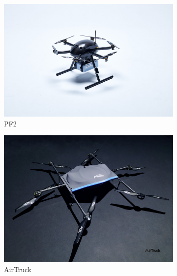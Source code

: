 \begin{figure}
    \centering
    \begin{subfigure}[b]{0.45\textwidth}
        \centering
        \includegraphics[width=\textwidth]{partes/img/PF2.jpg}
        \caption{PF2}
        \label{fig:pf2}
    \end{subfigure}
    \hfill
    \begin{subfigure}[b]{0.45\textwidth}
        \centering
        \includegraphics[width=\textwidth]{partes/img/AirTruck.jpg}
        \caption{AirTruck}
        \label{fig:AirTruck}
    \end{subfigure}
    \break
    \begin{subfigure}[b]{0.45\textwidth}
        \centering

\end{subfigure}
\end{figure}
